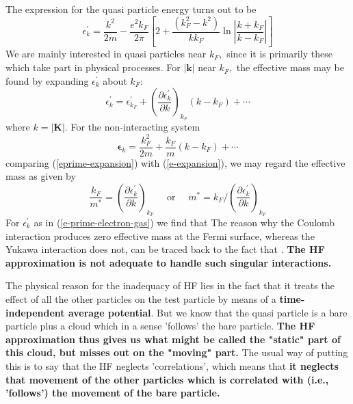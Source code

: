 \begin{center}
\end{center}
The expression for the quasi particle energy turns out to be
\begin{equation}\epsilon_{k}^{\prime}=\frac{k^{2}}{2 m}-\frac{e^{2} k_{F}}{2 \pi}\left[2+\frac{\left(k_{F}^{2}-k^{2}\right)}{k k_{F}} \ln \left|\frac{k+k_{F}}{k-k_{F}}\right|\right]
\label{e-prime-electron-gas}
\end{equation}
We are mainly interested in quasi particles near $k_{F},$ since it is primarily these which take part in physical processes. For $|\mathbf{k}|$ near $k_{F},$ the effective mass may be found by expanding $\epsilon_{k}^{\prime}$ about $k_{F}:$
\begin{equation}\epsilon_{k}^{\prime}=\epsilon_{k_F}^{\prime}+\left(\frac{\partial \epsilon_{k}^{\prime}}{\partial k}\right)_{k_{F}}\left(k-k_{F}\right)+\cdots
\label{eprime-expansion}
\end{equation}
where $k=|\mathbf{K}|$. For the non-interacting system
\begin{equation}\boldsymbol{\epsilon}_{k}=\frac{k_{F}^{2}}{2 m}+\frac{k_{F}}{m}\left(k-k_{F}\right)+\cdots
\label{e-expansion}
\end{equation}
comparing (\ref{eprime-expansion}) with (\ref{e-expansion}), we may regard the effective mass as given by
\begin{equation}\frac{k_{F}}{m^{*}}=\left(\frac{\partial \epsilon_{k}^{\prime}}{\partial k}\right)_{k_F} \quad \text { or } \quad m^{*}=k_{F} /\left(\frac{\partial \epsilon_{k}^{\prime}}{\partial k}\right)_{k_F}\end{equation}
For $\epsilon_k^{\prime}$ as in (\ref{e-prime-electron-gas}) we find that 
The reason why the Coulomb interaction produces zero effective mass at the Fermi surface, whereas the Yukawa interaction does not, can be traced back to the fact that . \textbf{The HF approximation is not adequate to handle such singular interactions.}
\begin{mybox}
The physical reason for the inadequacy of HF lies in the fact that it treats the effect of all the other particles on the test particle by means of a \textbf{time-independent average potential}. But we know that the quasi particle is a bare particle plus a cloud which in a sense 'follows' the bare particle. \textbf{The HF approximation thus gives us what might be called the "static" part of this cloud, but misses out on the "moving" part.} The usual way of putting this is to say that the HF neglects 'correlations', which means that \textbf{it neglects that movement of the other particles which is correlated with (i.e., 'follows') the movement of the bare particle.}
\end{mybox}
